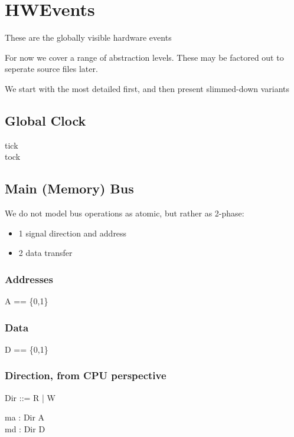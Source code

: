 %

\section{HWEvents}
 These are the globally visible hardware events

 For now we cover a range of abstraction levels.
 These may be factored out to seperate source files later.

 We start with the most detailed first,
 and then present slimmed-down variants



\subsection{Global Clock}%
\begin{circus}
\circchannel tick\\  %
\circchannel tock  %
\end{circus}

\subsection{Main (Memory) Bus} %
  We do not model bus operations as atomic, but rather as 2-phase:
	\begin{itemize}
   \item{1} signal direction and address
   \item{2} data transfer
	 \end{itemize}

\subsubsection{Addresses}
\begin{circus}
A == \{0,1\}
\end{circus}

\subsubsection{Data}
\begin{circus}
D == \{0,1\}
\end{circus}

\subsubsection{Direction, from CPU perspective}
\begin{circus}
Dir ::= R  %
        | W  %
\end{circus}
\begin{circus}

\circchannel ma : Dir \cross A\\  %
\circchannel md : Dir \cross D  %
\end{circus}



